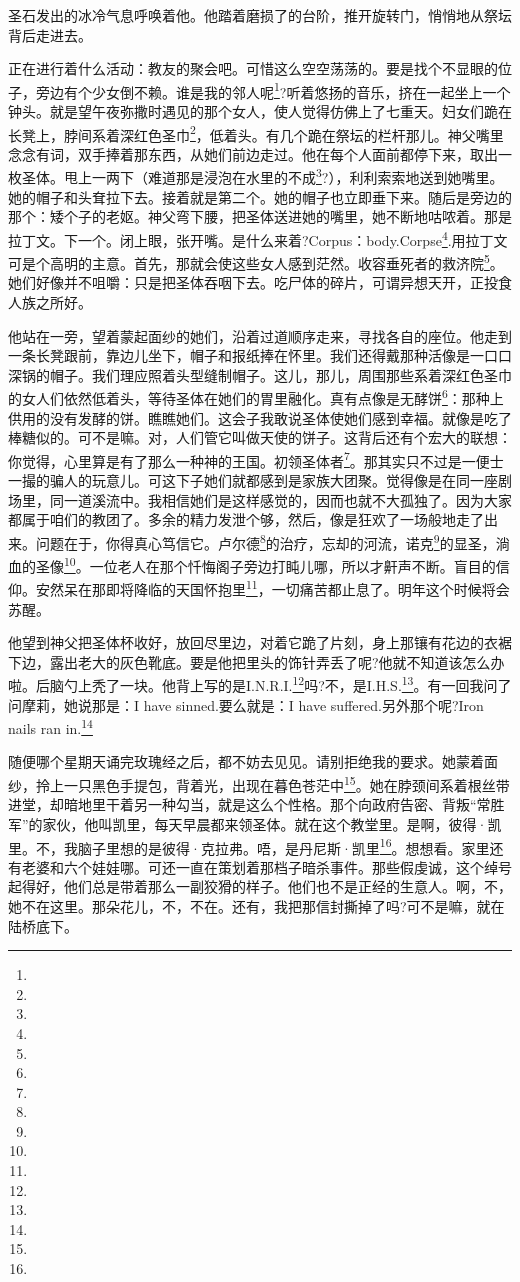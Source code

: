 \par 圣石发出的冰冷气息呼唤着他。他踏着磨损了的台阶，推开旋转门，悄悄地从祭坛背后走进去。
\par 正在进行着什么活动：教友的聚会吧。可惜这么空空荡荡的。要是找个不显眼的位子，旁边有个少女倒不赖。谁是我的邻人呢\footnote{}?听着悠扬的音乐，挤在一起坐上一个钟头。就是望午夜弥撒时遇见的那个女人，使人觉得仿佛上了七重天。妇女们跪在长凳上，脖间系着深红色圣巾\footnote{}，低着头。有几个跪在祭坛的栏杆那儿。神父嘴里念念有词，双手捧着那东西，从她们前边走过。他在每个人面前都停下来，取出一枚圣体。甩上一两下（难道那是浸泡在水里的不成\footnote{}?），利利索索地送到她嘴里。她的帽子和头耷拉下去。接着就是第二个。她的帽子也立即垂下来。随后是旁边的那个：矮个子的老妪。神父弯下腰，把圣体送进她的嘴里，她不断地咕哝着。那是拉丁文。下一个。闭上眼，张开嘴。是什么来着?Corpus：body.Corpse\footnote{}.用拉丁文可是个高明的主意。首先，那就会使这些女人感到茫然。收容垂死者的救济院\footnote{}。她们好像并不咀嚼：只是把圣体吞咽下去。吃尸体的碎片，可谓异想天开，正投食人族之所好。
\par 他站在一旁，望着蒙起面纱的她们，沿着过道顺序走来，寻找各自的座位。他走到一条长凳跟前，靠边儿坐下，帽子和报纸捧在怀里。我们还得戴那种活像是一口口深锅的帽子。我们理应照着头型缝制帽子。这儿，那儿，周围那些系着深红色圣巾的女人们依然低着头，等待圣体在她们的胃里融化。真有点像是无酵饼\footnote{}：那种上供用的没有发酵的饼。瞧瞧她们。这会子我敢说圣体使她们感到幸福。就像是吃了棒糖似的。可不是嘛。对，人们管它叫做天使的饼子。这背后还有个宏大的联想：你觉得，心里算是有了那么一种神的王国。初领圣体者\footnote{}。那其实只不过是一便士一撮的骗人的玩意儿。可这下子她们就都感到是家族大团聚。觉得像是在同一座剧场里，同一道溪流中。我相信她们是这样感觉的，因而也就不大孤独了。因为大家都属于咱们的教团了。多余的精力发泄个够，然后，像是狂欢了一场般地走了出来。问题在于，你得真心笃信它。卢尔德\footnote{}的治疗，忘却的河流，诺克\footnote{}的显圣，淌血的圣像\footnote{}。一位老人在那个忏悔阁子旁边打盹儿哪，所以才鼾声不断。盲目的信仰。安然呆在那即将降临的天国怀抱里\footnote{}，一切痛苦都止息了。明年这个时候将会苏醒。
\par 他望到神父把圣体杯收好，放回尽里边，对着它跪了片刻，身上那镶有花边的衣裾下边，露出老大的灰色靴底。要是他把里头的饰针弄丢了呢?他就不知道该怎么办啦。后脑勺上秃了一块。他背上写的是I.N.R.I.\footnote{}吗?不，是I.H.S.\footnote{}。有一回我问了问摩莉，她说那是：I have sinned.要么就是：I have suffered.另外那个呢?Iron nails ran in.\footnote{}
\par 随便哪个星期天诵完玫瑰经之后，都不妨去见见。请别拒绝我的要求。她蒙着面纱，拎上一只黑色手提包，背着光，出现在暮色苍茫中\footnote{}。她在脖颈间系着根丝带进堂，却暗地里干着另一种勾当，就是这么个性格。那个向政府告密、背叛“常胜军”的家伙，他叫凯里，每天早晨都来领圣体。就在这个教堂里。是啊，彼得·凯里。不，我脑子里想的是彼得·克拉弗。唔，是丹尼斯·凯里\footnote{}。想想看。家里还有老婆和六个娃娃哪。可还一直在策划着那档子暗杀事件。那些假虔诚，这个绰号起得好，他们总是带着那么一副狡猾的样子。他们也不是正经的生意人。啊，不，她不在这里。那朵花儿，不，不在。还有，我把那信封撕掉了吗?可不是嘛，就在陆桥底下。
